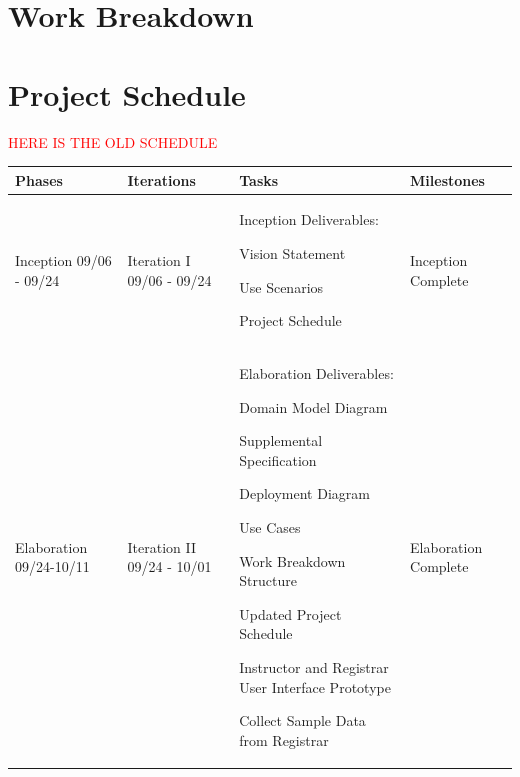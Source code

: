 \documentclass[11pt]{article}
\newenvironment{packed_itemize}{
\begin{itemize}
  \setlength{\itemsep}{1pt}
  \setlength{\parskip}{0pt}
  \setlength{\parsep}{0pt}
}{\end{itemize}}
\begin{document}
\section{Work Breakdown}




\section{Project Schedule}  %


\textcolor{red}{HERE IS THE OLD SCHEDULE}

\begin{tabular}{|m{0.9in}|m{0.9in}|m{4in}|m{.8in}|}
\hline
\textbf{Phases}  & \textbf{Iterations}  & \textbf{Tasks}        & \textbf{Milestones} \\
\hline\hline
Inception 09/06 - 09/24 &
Iteration I 09/06 - 09/24 & \vspace{0.1in}
Inception Deliverables:
	 \begin{packed_itemize}
	\vspace{-0.15in}
		\item Vision Statement
		\item Use Scenarios
		\item Project Schedule
	\vspace{-0.15in}
	\end{packed_itemize}
	& Inception Complete\\
\hline
Elaboration 09/24-10/11&
Iteration II 09/24 - 10/01&  \vspace{0.1in}
Elaboration Deliverables:
	 \begin{packed_itemize}
	\vspace{-0.15in}
		\item Domain Model Diagram
		\item Supplemental Specification
		\item Deployment Diagram
		\item Use Cases
		\item Work Breakdown Structure
		\item Updated Project Schedule
   \end{packed_itemize}

\raggedright{
Instructor and Registrar User Interface Prototype
}

Collect Sample Data from Registrar
& Elaboration Complete
\\
\hline


\end{tabular}
\end{document}

